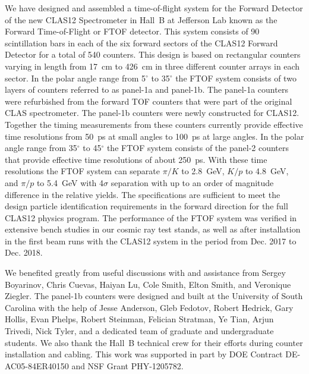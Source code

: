 \documentclass{elsart}
\begin{document}
We have designed and assembled a time-of-flight system for the Forward Detector of the new CLAS12
Spectrometer in Hall~B at Jefferson Lab known as the Forward Time-of-Flight or FTOF detector. This
system consists of 90 scintillation bars in each of the six forward sectors of the CLAS12 Forward Detector
for a total of 540 counters. This design is based on rectangular counters varying in length from 17~cm to
426~cm in three different counter arrays in each sector. In the polar angle range from 5$^\circ$ to
35$^\circ$ the FTOF system consists of two layers of counters referred to as panel-1a and panel-1b.
The panel-1a counters were refurbished from the forward TOF counters that were part of the original
CLAS spectrometer. The panel-1b counters were newly constructed for CLAS12. Together the timing
measurements from these counters currently provide effective time resolutions from 50~ps at small
angles to 100~ps at large angles. In the polar angle range from 35$^\circ$ to 45$^\circ$ the FTOF
system consists of the panel-2 counters that provide effective time resolutions of about 250~ps. With
these time resolutions the FTOF system can separate $\pi/K$ to 2.8~GeV, $K/p$ to 4.8~GeV, and $\pi/p$
to 5.4~GeV with 4$\sigma$ separation with up to an order of magnitude difference in the relative yields.
The specifications are sufficient to meet the design particle identification requirements in the forward
direction for the full CLAS12 physics program. The performance of the FTOF system was verified in
extensive bench studies in our cosmic ray test stands, as well as after installation in the first beam runs
with the CLAS12 system in the period from Dec. 2017 to Dec. 2018. 

\ack

We benefited greatly from useful discussions with and assistance from Sergey Boyarinov, Chris Cuevas,
Haiyan Lu, Cole Smith, Elton Smith, and Veronique Ziegler. The panel-1b counters were designed and built
at the University of South Carolina with the help of Jesse Anderson, Gleb Fedotov, Robert Hedrick, Gary
Hollis, Evan Phelps, Robert Steinman, Felician Stratman, Ye Tian, Arjun Trivedi, Nick Tyler, and a dedicated
team of graduate and undergraduate students. We also thank the Hall~B technical crew for their efforts
during counter installation and cabling. This work was supported in part by DOE Contract
DE-AC05-84ER40150 and NSF Grant PHY-1205782.
\end{document}
